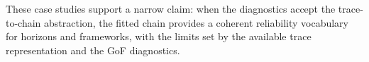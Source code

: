 These case studies support a narrow claim: when the diagnostics accept
the trace-to-chain abstraction, the fitted chain provides a coherent
reliability vocabulary for horizons and frameworks, with the limits set
by the available trace representation and the GoF diagnostics.

